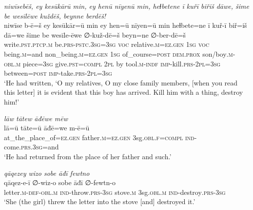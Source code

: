 \ea \label{KŠ.72}
\textit{niwīsebēš, ey kesūkārū min, ey henū nīyenū min, heɫbetene ī kuřī biřiš dāwe, šime be wesīlēwe kuždēš, beynne berdēš!} \\ 
\gll niwīse b-ē=š ey kesūkār=ū min ey hen=ū nīyen=ū min heɫbete=ne ī kuř-ī biř=iš dā=we šime be wesīle-ēwe ∅-kuž-dē=š beyn=ne ∅-ber-dē=š \\ 
 write\textsc{.pst}\textsc{.ptcp}\textsc{.m} be\textsc{.prs}\textsc{-pstc}\textsc{.3sg}\textsc{=3sg} \textsc{voc} relative\textsc{.m}\textsc{\textsc{=ez.gen}} \textsc{1sg} \textsc{voc} being\textsc{.m}=and non\_being\textsc{.m}\textsc{\textsc{=ez.gen}} \textsc{1sg} of\_course\textsc{=\textsc{post}} \textsc{dem.prox} son/boy\textsc{.m}\textsc{-obl}\textsc{.m} piece\textsc{=3sg} give\textsc{.pst}\textsc{=compl} \textsc{2pl} by tool\textsc{.m}\textsc{-indf} \textsc{imp-}kill\textsc{.prs}-\textsc{2pl}\textsc{=3sg} between\textsc{=\textsc{post}} \textsc{imp-}take\textsc{.prs}-\textsc{2pl}\textsc{=3sg} \\ 
\glt `He had written, ‘O my relatives, O my close family members, [when you read this letter] it is evident that this boy has arrived. Kill him with a thing, destroy him!'
\z 
 
\ea \label{KŠ.75}
\textit{lāw tātew āđēwe mēw} \\ 
\gll lā=ū tāte=ū āđē=we m-ē=ū \\ 
 at\_the\_place\_of\textsc{\textsc{=ez.gen}} father\textsc{.m}\textsc{\textsc{=ez.gen}} 3sg\textsc{.obl}\textsc{.f}\textsc{=compl} \textsc{ind-}come\textsc{.prs}\textsc{.3sg}=and \\ 
\glt `He had returned from the place of her father and such.'
\z 
 
\ea \label{KŠ.78}
\textit{qāqezey wizo sobe āđī fewtno} \\ 
\gll qāqez-e-ī ∅-wiz-o sobe āđī ∅-fewtn-o \\ 
 letter\textsc{.m}\textsc{-def}\textsc{-obl}\textsc{.m} \textsc{ind-}throw\textsc{.prs}\textsc{-3sg} stove\textsc{.m} 3sg\textsc{.obl}\textsc{.m} \textsc{ind-}destroy\textsc{.prs}\textsc{-3sg} \\ 
\glt `She (the girl) threw the letter into the stove [and] destroyed it.'
\z 
 
